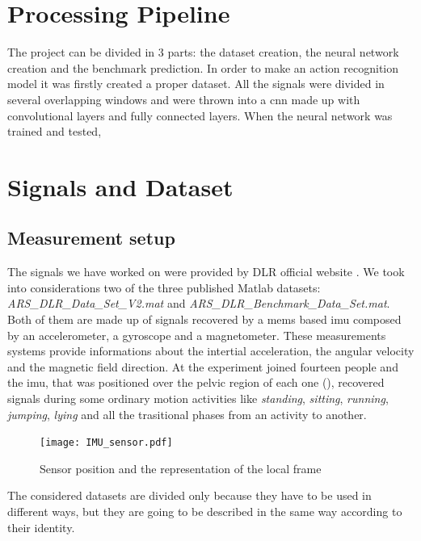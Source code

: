 
\section{Processing Pipeline}
\label{sec:processing_architecture}
The project can be divided in 3 parts: the dataset creation, the neural network creation and the benchmark prediction.
In order to make an action recognition model it was firstly created a proper dataset. All the signals were divided in several overlapping windows and were thrown into a \gls{cnn} made up with convolutional layers and fully connected layers.
When the neural network was trained and tested, 


\section{Signals and Dataset}
\label{sec:model}

\subsection{Measurement setup}
The signals we have worked on were provided by DLR official website \cite{DLR}. We took into considerations two of the three published Matlab datasets: \textit{ARS\_DLR\_Data\_Set\_V2.mat} and \textit{ARS\_DLR\_Benchmark\_Data\_Set.mat}. 
Both of them are made up of signals recovered by a \gls{mems} based \gls{imu} composed by an accelerometer, a gyroscope and a magnetometer. These measurements systems provide informations about the intertial acceleration, the angular velocity and the magnetic field direction.
At the experiment joined fourteen people and the \gls{imu}, that was positioned over the pelvic region of each one (), recovered signals during some ordinary motion activities like \textit{standing}, \textit{sitting}, \textit{running}, \textit{jumping}, \textit{lying} and all the trasitional phases from an activity to another.

\begin{figure}
\texttt{[image: IMU\_sensor.pdf]}
\caption{Sensor position and the representation of the local frame}
\label{fig:IMU}
\end{figure}

The considered datasets are divided only because they have to be used in different ways, but they are going to be described in the same way according to their identity.

